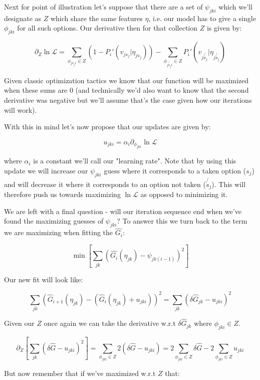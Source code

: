 \documentclass[11pt]{article}
\begin{document}
Next for point of illustration let's suppose that there are a set of $\psi_{jki}$ which we'll designate as $Z$ which share the same features $\eta$, i.e. our model has to give a single $\phi_{jki}$ for all such options. Our derivative then for that collection $Z$ is given by:

$$\partial_Z \ln{\mathcal{L}}=\sum_{\phi_{js_ji} \in Z}\left(1-P_i'(v_{js_j} | \eta_{js_j}) \right)-\sum_{\phi_{j\not{s_j}i}\in Z}P_i'(v_{j\not{s_j}} | \eta_{j\not{s_j}})$$

Given classic optimization tactics we know that our function will be maximized when these sums are $0$ (and technically we'd also want to know that the second derivative was negative but we'll assume that's the case given how our iterations will work). \newline

With this in mind let's now propose that our updates are given by:

$$u_{jki} = \alpha_i \partial_{\phi_{jki}} \ln{\mathcal{L}} $$

where $\alpha_i$ is a constant we'll call our "learning rate". Note that by using this update we will increase our $\psi_{jki}$ guess where it corresponds to a taken option ($s_j$) and will decrease it where it corresponds to an option not taken ($\not{s_j}$). This will therefore push us towards maximizing $\ln{\mathcal{L}}$ as opposed to minimizing it. \newline

We are left with a final question - will our iteration sequence end when we've found the maximizing guesses of $\psi_{jki}$? To answer this we turn back to the term we are maximizing when fitting the $\hat{G_i}$: 

$$\min{\left[ \sum_{jk}\left(\hat{G_i}(\eta_{jk}) - \psi_{jk(i-1)}\right)^2 \right]}$$

Our new fit will look like:

$$\sum_{jk}\left(\hat{G}_{i+1}(\eta_{jk}) - (\hat{G}_i(\eta_{jk}) + u_{jki})\right)^2=\sum_{jk}\left( \delta \hat{G}_{jk} - u_{jki}\right)^2$$

Given our $Z$ once again we can take the derivative w.r.t $\delta \hat{G}_{jk}$ where $\phi_{jki} \in Z$. 

$$\partial_Z \left[ \sum_{jk}\left( \delta \hat{G} - u_{jki}\right)^2 \right] = \sum_{\phi_{jki} \in Z} 2\left( \delta \hat{G} - u_{jki}\right) = 2\sum_{\phi_{jki} \in Z} \delta \hat{G} - 2\sum_{\phi_{jki} \in Z} u_{jki}$$

But now remember that if we've maximized w.r.t $Z$ that:
\end{document}
